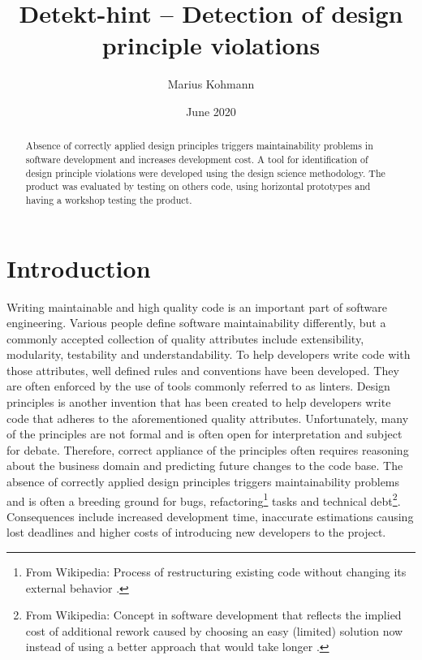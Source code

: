 \documentclass{report}
\title{Detekt-hint -- Detection of design principle violations}
\author{Marius Kohmann}
\date{June 2020}
\begin{document}
\maketitle

\begin{abstract}
	Absence of correctly applied design principles triggers maintainability problems in software development and increases development cost. A tool for identification of design principle violations were developed using the design science methodology. The product was evaluated by testing on others code, using horizontal prototypes and having a workshop testing the product. 
	
	
	
\end{abstract}


\clearpage
\tableofcontents
\clearpage
\chapter{Introduction}

Writing maintainable and high quality code is an important part of software engineering. Various people define software maintainability differently, but a commonly accepted collection of quality attributes include extensibility, modularity, testability and understandability. To help developers write code with those attributes, well defined rules and conventions have been developed. They are often enforced by the use of tools commonly referred to as linters. Design principles is another invention that has been created to help developers write code that adheres to the aforementioned quality attributes. Unfortunately, many of the principles are not formal and is often open for interpretation and subject for debate. Therefore, correct appliance of the principles often requires reasoning about the business domain and predicting future changes to the code base. The absence of correctly applied design principles triggers maintainability problems and is often a breeding ground for bugs, refactoring\footnote{From Wikipedia: Process of restructuring existing code without changing its external behavior \cite{refactoring}.} tasks and technical debt\footnote{From Wikipedia: Concept in software development that reflects the implied cost of additional rework caused by choosing an easy (limited) solution now instead of using a better approach that would take longer \cite{technicalDebt}.}. Consequences include increased development time, inaccurate estimations causing lost deadlines and higher costs of introducing new developers to the project.
\end{document}
